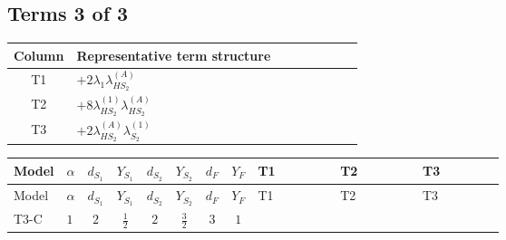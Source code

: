 \documentclass[8pt]{article}
\begin{document}
\begin{landscape}
\subsection*{Terms 3 of 3}
\begin{center}
\begin{tabular}{@{}c >{\raggedright\arraybackslash}p{0.82\linewidth}@{}}
\toprule
Column & Representative term structure \\
\midrule
T1 & \(\displaystyle +2 {\lambda_1} {\lambda_{HS_2}^{(A)}}\) \\
\midrule
T2 & \(\displaystyle +8 {\lambda_{HS_2}^{(1)}} {\lambda_{HS_2}^{(A)}}\) \\
\midrule
T3 & \(\displaystyle +2 {\lambda_{HS_2}^{(A)}} {\lambda_{S_2}^{(1)}}\) \\
\midrule
\bottomrule
\end{tabular}
\end{center}
\smallskip
\tiny
\begin{longtable}{@{}llcccccc >{\raggedright\arraybackslash}p{0.21\linewidth} >{\raggedright\arraybackslash}p{0.21\linewidth} >{\raggedright\arraybackslash}p{0.21\linewidth}@{}}
\toprule
Model & $\alpha$ & $d_{S_1}$ & $Y_{S_1}$ & $d_{S_2}$ & $Y_{S_2}$ & $d_F$ & $Y_F$ & T1 & T2 & T3 \\
\midrule
\endfirsthead
\toprule
Model & $\alpha$ & $d_{S_1}$ & $Y_{S_1}$ & $d_{S_2}$ & $Y_{S_2}$ & $d_F$ & $Y_F$ & T1 & T2 & T3 \\
\midrule
\endhead
T3-C & $1$ & $2$ & $\frac{1}{2}$ & $2$ & $\frac{3}{2}$ & $3$ & $1$ & \scriptsize\adjustbox{max width=\linewidth}{$\begin{gathered} +2 {\lambda_1} {\lambda_{HS_2}^{(A)}}\end{gathered}$} & \scriptsize\adjustbox{max width=\linewidth}{$\begin{gathered} +8 {\lambda_{HS_2}^{(1)}} {\lambda_{HS_2}^{(A)}}\end{gathered}$} & \scriptsize\adjustbox{max width=\linewidth}{$\begin{gathered} +2 {\lambda_{HS_2}^{(A)}} {\lambda_{S_2}^{(1)}}\end{gathered}$} \\
\midrule
\bottomrule
\end{longtable}
\end{landscape}
\end{document}
